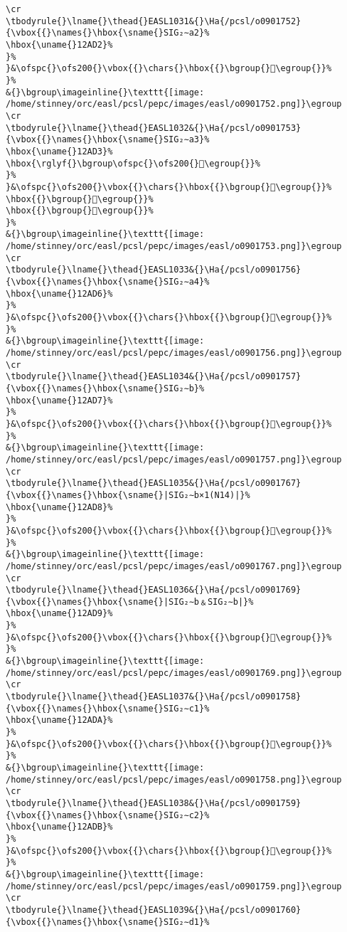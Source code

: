 \begin{verbatim}
\cr
\tbodyrule{}\lname{}\thead{}EASL1031&{}\Ha{/pcsl/o0901752}{\vbox{{}\names{}\hbox{\sname{}SIG₂∼a2}%
\hbox{\uname{}12AD2}%
}%
}&\ofspc{}\ofs200{}\vbox{{}\chars{}\hbox{{}\bgroup{}𒫒\egroup{}}%
}%
&{}\bgroup\imageinline{}\texttt{[image: /home/stinney/orc/easl/pcsl/pepc/images/easl/o0901752.png]}\egroup
\cr
\tbodyrule{}\lname{}\thead{}EASL1032&{}\Ha{/pcsl/o0901753}{\vbox{{}\names{}\hbox{\sname{}SIG₂∼a3}%
\hbox{\uname{}12AD3}%
\hbox{\rglyf{}\bgroup\ofspc{}\ofs200{}𒫓\egroup{}}%
}%
}&\ofspc{}\ofs200{}\vbox{{}\chars{}\hbox{{}\bgroup{}𒫓\egroup{}}%
\hbox{{}\bgroup{}𒫔\egroup{}}%
\hbox{{}\bgroup{}𒫕\egroup{}}%
}%
&{}\bgroup\imageinline{}\texttt{[image: /home/stinney/orc/easl/pcsl/pepc/images/easl/o0901753.png]}\egroup
\cr
\tbodyrule{}\lname{}\thead{}EASL1033&{}\Ha{/pcsl/o0901756}{\vbox{{}\names{}\hbox{\sname{}SIG₂∼a4}%
\hbox{\uname{}12AD6}%
}%
}&\ofspc{}\ofs200{}\vbox{{}\chars{}\hbox{{}\bgroup{}𒫖\egroup{}}%
}%
&{}\bgroup\imageinline{}\texttt{[image: /home/stinney/orc/easl/pcsl/pepc/images/easl/o0901756.png]}\egroup
\cr
\tbodyrule{}\lname{}\thead{}EASL1034&{}\Ha{/pcsl/o0901757}{\vbox{{}\names{}\hbox{\sname{}SIG₂∼b}%
\hbox{\uname{}12AD7}%
}%
}&\ofspc{}\ofs200{}\vbox{{}\chars{}\hbox{{}\bgroup{}𒫗\egroup{}}%
}%
&{}\bgroup\imageinline{}\texttt{[image: /home/stinney/orc/easl/pcsl/pepc/images/easl/o0901757.png]}\egroup
\cr
\tbodyrule{}\lname{}\thead{}EASL1035&{}\Ha{/pcsl/o0901767}{\vbox{{}\names{}\hbox{\sname{}|SIG₂∼b×1(N14)|}%
\hbox{\uname{}12AD8}%
}%
}&\ofspc{}\ofs200{}\vbox{{}\chars{}\hbox{{}\bgroup{}𒫘\egroup{}}%
}%
&{}\bgroup\imageinline{}\texttt{[image: /home/stinney/orc/easl/pcsl/pepc/images/easl/o0901767.png]}\egroup
\cr
\tbodyrule{}\lname{}\thead{}EASL1036&{}\Ha{/pcsl/o0901769}{\vbox{{}\names{}\hbox{\sname{}|SIG₂∼b﹠SIG₂∼b|}%
\hbox{\uname{}12AD9}%
}%
}&\ofspc{}\ofs200{}\vbox{{}\chars{}\hbox{{}\bgroup{}𒫙\egroup{}}%
}%
&{}\bgroup\imageinline{}\texttt{[image: /home/stinney/orc/easl/pcsl/pepc/images/easl/o0901769.png]}\egroup
\cr
\tbodyrule{}\lname{}\thead{}EASL1037&{}\Ha{/pcsl/o0901758}{\vbox{{}\names{}\hbox{\sname{}SIG₂∼c1}%
\hbox{\uname{}12ADA}%
}%
}&\ofspc{}\ofs200{}\vbox{{}\chars{}\hbox{{}\bgroup{}𒫚\egroup{}}%
}%
&{}\bgroup\imageinline{}\texttt{[image: /home/stinney/orc/easl/pcsl/pepc/images/easl/o0901758.png]}\egroup
\cr
\tbodyrule{}\lname{}\thead{}EASL1038&{}\Ha{/pcsl/o0901759}{\vbox{{}\names{}\hbox{\sname{}SIG₂∼c2}%
\hbox{\uname{}12ADB}%
}%
}&\ofspc{}\ofs200{}\vbox{{}\chars{}\hbox{{}\bgroup{}𒫛\egroup{}}%
}%
&{}\bgroup\imageinline{}\texttt{[image: /home/stinney/orc/easl/pcsl/pepc/images/easl/o0901759.png]}\egroup
\cr
\tbodyrule{}\lname{}\thead{}EASL1039&{}\Ha{/pcsl/o0901760}{\vbox{{}\names{}\hbox{\sname{}SIG₂∼d1}%

\end{verbatim}
